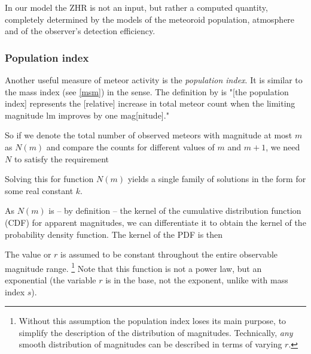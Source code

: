             In our model the ZHR is not an input, but rather a computed quantity, completely determined by the
            models of the meteoroid population, atmosphere and of the observer's detection efficiency.

        \subsubsection{Population index} \label{msar}
            Another useful measure of meteor activity is the \emph{population index}.
            It is similar to the mass index (see \cref{msm}) in the sense.
            The definition by \citet{molau2015} is "[the population index] represents the [relative] increase
            in total meteor count when the limiting magnitude $\mathrm{lm}$ improves by one mag[nitude]."

            So if we denote the total number of observed meteors with magnitude at most $m$ as $N(m)$
            and compare the counts for different values of $m$ and $m + 1$, we need $N$ to satisfy the requirement

            Solving this for function $N(m)$ yields a single family of solutions
            in the form
            for some real constant $k$.

            As $N(m)$ is -- by definition -- the kernel of the
            cumulative distribution function (CDF) for apparent magnitudes, we can differentiate it
            to obtain the kernel of the probability density function. The kernel of the PDF is then

            The value or $r$ is assumed to be constant throughout the entire observable magnitude range.%
            \footnote{Without this assumption the population index loses its main purpose,
            to simplify the description of the distribution of magnitudes.
            Technically, \emph{any} smooth distribution of magnitudes can be described in terms of varying $r$.}
            Note that this function is not a power law, but an exponential (the variable $r$
            is in the base, not the exponent, unlike with mass index $s$).

